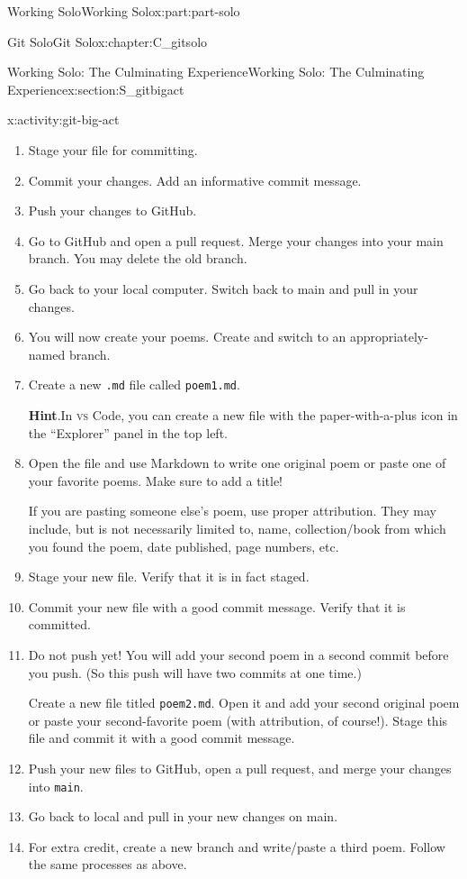 \documentclass[oneside,10pt,]{book}
\newcommand{\blocktitlefont}{\relax}
\newcommand{\mono}[1]{\texttt{#1}}
\newcommand{\initialism}[1]{\textsc{\MakeLowercase{#1}}}
\begin{document}
\begin{partptx}{Working Solo}{}{Working Solo}{}{}{x:part:part-solo}
\begin{chapterptx}{Git Solo}{}{Git Solo}{}{}{x:chapter:C_gitsolo}
\begin{sectionptx}{Working Solo: The Culminating Experience}{}{Working Solo: The Culminating Experience}{}{}{x:section:S_gitbigact}
\begin{activity}{}{x:activity:git-big-act}
\begin{enumerate}[font=\bfseries,label=(\alph*),ref=\alph*]
\item{}Stage your file for committing.%
\item{}Commit your changes. Add an informative commit message.%
\item{}Push your changes to GitHub.%
\item{}Go to GitHub and open a pull request. Merge your changes into your main branch. You may delete the old branch.%
\item{}Go back to your local computer. Switch back to main and pull in your changes.%
\item{}You will now create your poems. Create and switch to an appropriately-named branch.%
\item{}Create a new \mono{.md} file called \mono{poem1.md}.%
\par\smallskip%
\noindent\textbf{\blocktitlefont Hint}.\hypertarget{g:hint:idm479654744}{}\quad{}In \initialism{VS} Code, you can create a new file with the paper-with-a-plus icon in the ``Explorer'' panel in the top left.%
\item{}Open the file and use Markdown to write one original poem or paste one of your favorite poems. Make sure to add a title!%
\par
If you are pasting someone else's poem, use proper attribution. They may include, but is not necessarily limited to, name, collection\slash{}book from which you found the poem, date published, page numbers, etc.%
\item{}Stage your new file. Verify that it is in fact staged.%
\item{}Commit your new file with a good commit message. Verify that it is committed.%
\item{}Do not push yet! You will add your second poem in a second commit before you push. (So this push will have two commits at one time.)%
\par
Create a new file titled \mono{poem2.md}. Open it and add your second original poem or paste your second-favorite poem (with attribution, of course!). Stage this file and commit it with a good commit message.%
\item{}Push your new files to GitHub, open a pull request, and merge your changes into \mono{main}.%
\item{}Go back to local and pull in your new changes on main.%
\item{}For extra credit, create a new branch and write\slash{}paste a third poem. Follow the same processes as above.%
\end{enumerate}

\end{activity}
\end{sectionptx}
\end{chapterptx}
\end{partptx}
\end{document}
